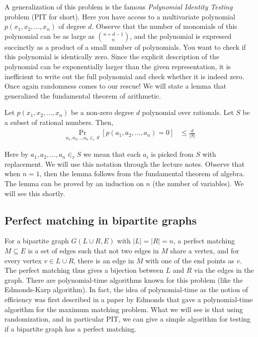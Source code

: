 A generalization of this problem is the famous \textit{Polynomial Identity Testing} problem (PIT for short). Here you have access to a multivariate polynomial $p(x_1, x_2, \ldots, x_n)$ of degree $d$. Observe that the number of monomials of this polynomial can be as large as $\binom{n+d-1}{n}$, and the polynomial is expressed succinctly as a product of a small number of polynomials. You want to check if this polynomial is identically zero. Since the explicit description of the polynomial can be exponentially larger than the given representation, it is inefficient to write out the full polynomial and check whether it is indeed zero. Once again randomness comes to our rescue! We will state a lemma that generalized the fundamental theorem of arithmetic.

\begin{lemma}
	Let $p(x_1, x_2, \ldots, x_n)$ be a non-zero degree $d$ polynomial over rationals. Let $S$ be a subset of rational numbers. Then,
	\begin{align*}
		\Pr_{a_1, a_2, \ldots a_n \in_r S} \left[ p(a_1, a_2, \ldots, a_n) = 0  \right] &\leq \frac{d}{|S|}
	\end{align*} 
	\label{lem:dlsz}
\end{lemma}

Here by ${a_1, a_2, \ldots, a_n \in_r S}$ we mean that each $a_i$ is picked from $S$ with replacement. We will use this notation through the lecture notes. Observe that when $n=1$, then the lemma follows from the fundamental theorem of algebra. The lemma can be proved by an induction on $n$ (the number of variables). We will see this shortly.

\subsection{Perfect matching in bipartite graphs}

For a bipartite graph $G(L\cup R,E)$ with $|L| = |R| = n$, a perfect matching $M\subseteq E$ is a set of edges such that not two edges in $M$ share a vertex, and for every vertex $v \in L\cup R$, there is an edge in $M$ with one of the end points as $v$. The perfect matching thus gives a bijection between $L$ and $R$ via the edges in the graph. There are polynomial-time algorithms known for this problem (like the Edmonds-Karp algorithm). In fact, the idea of polynomial-time as the notion of efficiency was first described in a paper by Edmonds that gave a polynomial-time algorithm for the maximum matching problem. What we will see is that using randomization, and in particular PIT, we can give a simple algorithm for testing if a bipartite graph has a perfect matching.

